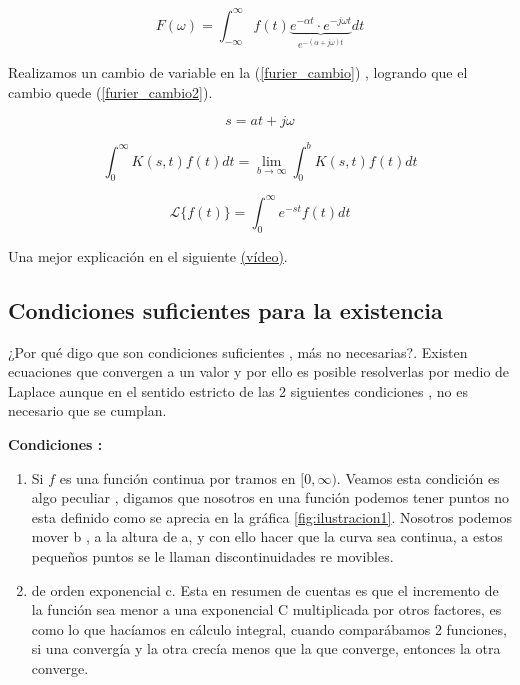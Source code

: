 \begin{equation}
	F(\omega)= \int^{\infty}_{- \infty} f(t)
	\underbrace{e^{- \alpha t} \cdot e^{- j \omega t}}_{e^{- (\alpha + j \omega)t}} dt 
	\label{furier_cambio}
\end{equation}

Realizamos un cambio de  variable  en la (\ref{furier_cambio}) , logrando que el cambio quede (\ref{furier_cambio2}).

\begin{equation}
	s= at + j \omega
	\label{furier_cambio2}
\end{equation}

\begin{equation}
	\int_{0}^{\infty} K(s, t) f(t) d t=\lim _{b \rightarrow \infty} \int_{0}^{b} K(s, t) f(t) d t
\end{equation}


\begin{equation}
	\mathscr{L}\{f(t)\}=\int_{0}^{\infty} e^{-s t} f(t) d t
\end{equation}

Una mejor explicación en el siguiente  \href{https://www.youtube.com/watch?v=i1wRqo\_2zgw}{(vídeo)}.

\subsection{Condiciones suficientes para la existencia}

¿Por qué digo que son condiciones suficientes , más no necesarias?. Existen ecuaciones que convergen a un valor y por ello es posible resolverlas por medio de Laplace aunque en el sentido estricto de las 2 siguientes condiciones , no es necesario que se cumplan.

\textbf{Condiciones :}
\begin{enumerate}
	\item Si $ f  $ es una función continua por tramos en $ [0, \infty) $.
	\subitem Veamos esta condición es algo peculiar , digamos  que nosotros en una función podemos tener puntos no esta definido como se aprecia en la gráfica \ref{fig:ilustracion1}. Nosotros podemos mover b , a la altura de a, y con ello hacer que la curva sea continua, a estos pequeños puntos se le llaman discontinuidades re movibles.
	\item  de orden exponencial c.
	\subitem Esta en resumen de cuentas es que el incremento de la función sea menor a una exponencial C multiplicada por otros factores, es como lo que hacíamos en cálculo integral, cuando comparábamos 2 funciones, si una convergía y la otra crecía menos que la que converge, entonces la otra converge.
\end{enumerate}

